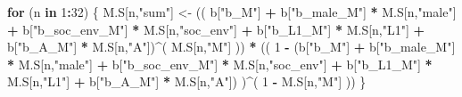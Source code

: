 \documentclass[
]{book}
\newenvironment{Shaded}{\begin{snugshade}}{\end{snugshade}}
\newcommand{\ControlFlowTok}[1]{\textcolor[rgb]{0.13,0.29,0.53}{\textbf{#1}}}
\newcommand{\DecValTok}[1]{\textcolor[rgb]{0.00,0.00,0.81}{#1}}
\newcommand{\NormalTok}[1]{#1}
\newcommand{\OtherTok}[1]{\textcolor[rgb]{0.56,0.35,0.01}{#1}}
\newcommand{\SpecialCharTok}[1]{\textcolor[rgb]{0.81,0.36,0.00}{\textbf{#1}}}
\newcommand{\StringTok}[1]{\textcolor[rgb]{0.31,0.60,0.02}{#1}}
\begin{document}
\begin{Shaded}
\begin{Highlighting}[]
  \ControlFlowTok{for}\NormalTok{ (n }\ControlFlowTok{in} \DecValTok{1}\SpecialCharTok{:}\DecValTok{32}\NormalTok{) \{}
\NormalTok{    M.S[n,}\StringTok{"sum"}\NormalTok{] }\OtherTok{\textless{}{-}}\NormalTok{ (( b[}\StringTok{"b\_M"}\NormalTok{] }\SpecialCharTok{+}                                                              
\NormalTok{                         b[}\StringTok{"b\_male\_M"}\NormalTok{] }\SpecialCharTok{*}\NormalTok{ M.S[n,}\StringTok{"male"}\NormalTok{] }\SpecialCharTok{+} 
\NormalTok{                         b[}\StringTok{"b\_soc\_env\_M"}\NormalTok{] }\SpecialCharTok{*}\NormalTok{ M.S[n,}\StringTok{"soc\_env"}\NormalTok{] }\SpecialCharTok{+} 
\NormalTok{                         b[}\StringTok{"b\_L1\_M"}\NormalTok{] }\SpecialCharTok{*}\NormalTok{ M.S[n,}\StringTok{"L1"}\NormalTok{] }\SpecialCharTok{+}
\NormalTok{                         b[}\StringTok{"b\_A\_M"}\NormalTok{] }\SpecialCharTok{*}\NormalTok{ M.S[n,}\StringTok{"A"}\NormalTok{])}\SpecialCharTok{\^{}}\NormalTok{( M.S[n,}\StringTok{"M"}\NormalTok{] )) }\SpecialCharTok{*}
\NormalTok{      (( }\DecValTok{1} \SpecialCharTok{{-}}\NormalTok{ (b[}\StringTok{"b\_M"}\NormalTok{] }\SpecialCharTok{+} 
\NormalTok{                b[}\StringTok{"b\_male\_M"}\NormalTok{] }\SpecialCharTok{*}\NormalTok{ M.S[n,}\StringTok{"male"}\NormalTok{] }\SpecialCharTok{+} 
\NormalTok{                b[}\StringTok{"b\_soc\_env\_M"}\NormalTok{] }\SpecialCharTok{*}\NormalTok{ M.S[n,}\StringTok{"soc\_env"}\NormalTok{] }\SpecialCharTok{+} 
\NormalTok{                b[}\StringTok{"b\_L1\_M"}\NormalTok{] }\SpecialCharTok{*}\NormalTok{ M.S[n,}\StringTok{"L1"}\NormalTok{] }\SpecialCharTok{+}
\NormalTok{                b[}\StringTok{"b\_A\_M"}\NormalTok{] }\SpecialCharTok{*}\NormalTok{ M.S[n,}\StringTok{"A"}\NormalTok{]) )}\SpecialCharTok{\^{}}\NormalTok{( }\DecValTok{1} \SpecialCharTok{{-}}\NormalTok{ M.S[n,}\StringTok{"M"}\NormalTok{] )) }
\NormalTok{    \}}
  

\end{Highlighting}
\end{Shaded}
\end{document}
